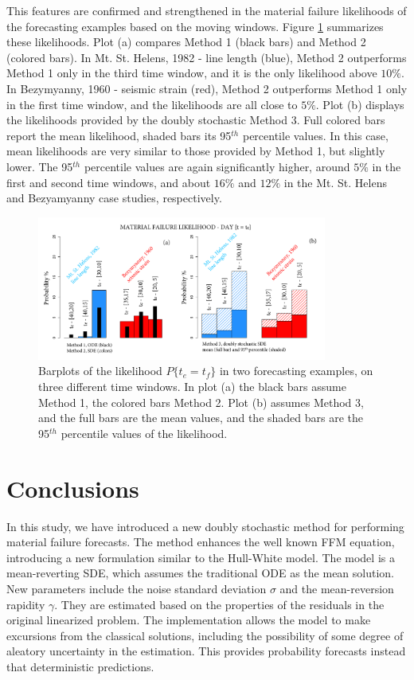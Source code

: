 \documentclass{article}
\begin{document}
This features are confirmed and strengthened in the material failure likelihoods of the forecasting examples based on the moving windows. Figure \ref{Fig16} summarizes these likelihoods. Plot (a) compares Method 1 (black bars) and Method 2 (colored bars). In Mt. St. Helens, 1982 - line length (blue), Method 2 outperforms Method 1 only in the third time window, and it is the only likelihood above $10\%$. In Bezymyanny, 1960 - seismic strain (red), Method 2 outperforms Method 1 only in the first time window, and the likelihoods are all close to $5\%$. Plot (b) displays the likelihoods provided by the doubly stochastic Method 3. Full colored bars report the mean likelihood, shaded bars its 95$^{th}$ percentile values. In this case, mean likelihoods are very similar to those provided by Method 1, but slightly lower. The 95$^{th}$ percentile values are again significantly higher, around $5\%$ in the first and second time windows, and about $16\%$ and $12\%$ in the Mt. St. Helens and Bezyamyanny case studies, respectively.

\begin{figure}[H]
\centering
\includegraphics[width=0.85\textwidth]{Fig16_plus.png}
\caption{Barplots of the likelihood $P\{t_e=t_f\}$ in two forecasting examples, on three different time windows. In plot (a) the black bars assume Method 1, the colored bars Method 2. Plot (b) assumes Method 3, and the full bars are the mean values, and the shaded bars are the 95$^{th}$ percentile values of the likelihood.}
\label{Fig16}
\end{figure}

\section{Conclusions}
In this study, we have introduced a new doubly stochastic method for performing material failure forecasts. The method enhances the well known FFM equation, introducing a new formulation similar to the Hull-White model. The model is a mean-reverting SDE, which assumes the traditional ODE as the mean solution. New parameters include the noise standard deviation $\sigma$ and the mean-reversion rapidity $\gamma$. They are estimated based on the properties of the residuals in the original linearized problem. The implementation allows the model to make excursions from the classical solutions, including the possibility of some degree of aleatory uncertainty in the estimation. This provides probability forecasts instead that deterministic predictions.
\end{document}
